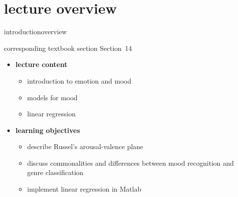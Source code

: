 


\subtitle{Module 14: Mood Recognition}


	

    \section[overview]{lecture overview}
        \begin{frame}{introduction}{overview}
            \begin{block}{corresponding textbook section}
                    Section~14
            \end{block}

            \begin{itemize}
                \item   \textbf{lecture content}
                    \begin{itemize}
                        \item   introduction to emotion and mood
                        \item   models for mood
                        \item   linear regression
                    \end{itemize}
                \bigskip
                \item<2->   \textbf{learning objectives}
                    \begin{itemize}
                        \item   describe Russel's arousal-valence plane
                        \item   discuss commonalities and differences between mood recognition and genre classification
                        \item   implement linear regression in Matlab
                    \end{itemize}
            \end{itemize}
        \end{frame}


